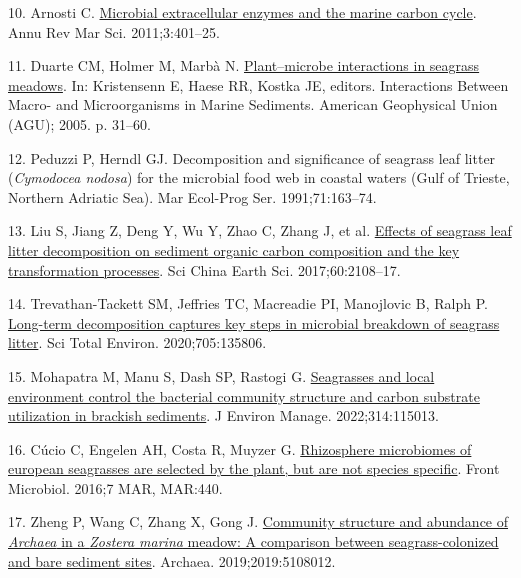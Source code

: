 \documentclass[
  12 pt,
]{article}
\newlength{\cslhangindent}
\newlength{\cslentryspacingunit} %
\newenvironment{CSLReferences}[2] %
 {%
  \setlength{\parindent}{0pt}
  \ifodd #1
  \let\oldpar\par
  \def\par{\hangindent=\cslhangindent\oldpar}
  \fi
  \setlength{\parskip}{#2\cslentryspacingunit}
 }%
 {}
\begin{document}
\begin{CSLReferences}{0}{0}
\leavevmode{}%
10. Arnosti C. \href{https://doi.org/10.1146/annurev-marine-120709-142731}{Microbial extracellular enzymes and the marine carbon cycle}. Annu Rev Mar Sci. 2011;3:401--25.

\leavevmode{}%
11. Duarte CM, Holmer M, Marbà N. \href{https://doi.org/10.1029/CE060p0031}{Plant--microbe interactions in seagrass meadows}. In: Kristensenn E, Haese RR, Kostka JE, editors. Interactions {Between Macro-} and {Microorganisms} in {Marine Sediments}. American Geophysical Union (AGU); 2005. p. 31--60.

\leavevmode{}%
12. Peduzzi P, Herndl GJ. Decomposition and significance of seagrass leaf litter ({{\emph{Cymodocea nodosa}}}) for the microbial food web in coastal waters ({Gulf} of {Trieste}, {Northern Adriatic Sea}). Mar Ecol-Prog Ser. 1991;71:163--74.

\leavevmode{}%
13. Liu S, Jiang Z, Deng Y, Wu Y, Zhao C, Zhang J, et al. \href{https://doi.org/10.1007/s11430-017-9147-4}{Effects of seagrass leaf litter decomposition on sediment organic carbon composition and the key transformation processes}. Sci China Earth Sci. 2017;60:2108--17.

\leavevmode{}%
14. Trevathan-Tackett SM, Jeffries TC, Macreadie PI, Manojlovic B, Ralph P. \href{https://doi.org/10.1016/j.scitotenv.2019.135806}{Long-term decomposition captures key steps in microbial breakdown of seagrass litter}. Sci Total Environ. 2020;705:135806.

\leavevmode{}%
15. Mohapatra M, Manu S, Dash SP, Rastogi G. \href{https://doi.org/10.1016/j.jenvman.2022.115013}{Seagrasses and local environment control the bacterial community structure and carbon substrate utilization in brackish sediments}. J Environ Manage. 2022;314:115013.

\leavevmode{}%
16. Cúcio C, Engelen AH, Costa R, Muyzer G. \href{https://doi.org/10.3389/fmicb.2016.00440}{Rhizosphere microbiomes of european seagrasses are selected by the plant, but are not species specific}. Front Microbiol. 2016;7 MAR, MAR:440.

\leavevmode{}%
17. Zheng P, Wang C, Zhang X, Gong J. \href{https://doi.org/10.1155/2019/5108012}{Community structure and abundance of {{\emph{Archaea}}} in a {{\emph{Zostera marina}}} meadow: A comparison between seagrass-colonized and bare sediment sites}. Archaea. 2019;2019:5108012.


\end{CSLReferences}
\end{document}
